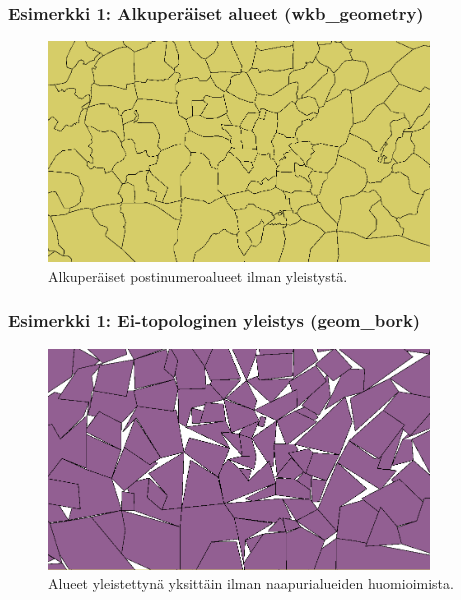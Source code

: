 \documentclass[english,finnish]{beamer}
\begin{document}
\begin{frame}[fragile=singleslide]\frametitle{Esimerkki 1: Alkuperäiset alueet (wkb\_geometry)}
\begin{figure}[h]
\begin{center}
\includegraphics[width=0.90\textwidth]{pnro_base.png}
\caption{Alkuperäiset postinumeroalueet ilman yleistystä.}
\label{kuva1}
\end{center}
\end{figure}
\end{frame}

\begin{frame}[fragile=singleslide]\frametitle{Esimerkki 1: Ei-topologinen yleistys (geom\_bork)}
\begin{figure}[h]
\begin{center}
\includegraphics[width=0.90\textwidth]{pnro_simp500.png}
\caption{Alueet yleistettynä yksittäin ilman naapurialueiden huomioimista.}
\label{kuva2}
\end{center}
\end{figure}
\end{frame}
\end{document}
